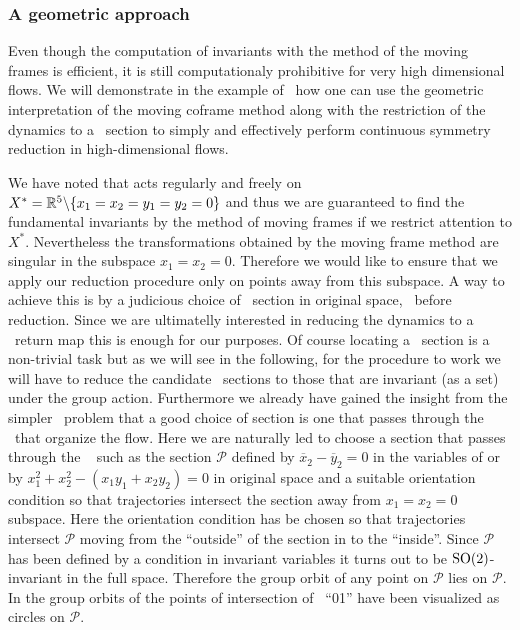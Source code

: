 \subsubsection{A geometric approach}
\label{laserMFnum}

Even though the computation of invariants with the method of the moving frames is efficient,
it is still computationaly prohibitive for very high dimensional flows. We will demonstrate
in the example of \CLe\ how one can use the geometric interpretation of the moving coframe method
along with the restriction of the dynamics to a \Poincare\ section to simply and effectively
perform continuous symmetry reduction in high-dimensional flows.

We have noted that  acts regularly and freely on $X^*=\mathbb{R}^{5}\backslash\{x_1=x_2=y_1=y_2=0\}$ and
thus we are guaranteed to find the fundamental invariants by the method of moving frames
if we restrict attention to $X^*$. Nevertheless the transformations 
obtained by the moving frame method are singular in the subspace $x_1=x_2=0$. Therefore
we would like to ensure that we apply our reduction procedure only on points away from this
subspace. A way to achieve this is by a judicious choice of \Poincare\ section in original space,
\ie~before reduction. Since we are ultimatelly interested in reducing the dynamics to a \Poincare\
return map this is enough for our purposes. Of course locating a \Poincare\ section is a non-trivial
task but as we will see in the following, for the procedure to work we will
have to reduce the candidate \Poincare\ sections to those that are invariant (as a set) under
the group action. Furthermore we already have gained the insight from the simpler \Le\ problem
that a good choice of section is one that passes through the \eqva\ that organize the flow.
Here we are naturally led to choose a section that passes through the \reqv~\REQB{1} such as the
section $\mathcal{P}$ defined by $\overline{x}_2-\overline{y}_2=0$ in the variables of
\refeq{eq:invLaser} or by $x_1^2+x_2^2-(x_1 y_1 + x_2 y_2)=0$ in original space and
a suitable orientation condition so that trajectories intersect the section away from
$x_1=x_2=0$ subspace. Here the orientation condition has be chosen so that trajectories intersect
$\mathcal{P}$ moving from the ``outside'' of the section in \reffig{fig:CLEmartini} to the
``inside''.
Since $\mathcal{P}$ has been defined by a condition in invariant variables 
it turns out to be $\mathrm{SO}(2)$-invariant in the full space. Therefore the group orbit of any point on
$\mathcal{P}$ lies on $\mathcal{P}$. In \reffig{fig:CLEmartini} the group orbits of the points
of intersection of \rpo~``01'' have been visualized as circles on $\mathcal{P}$.

